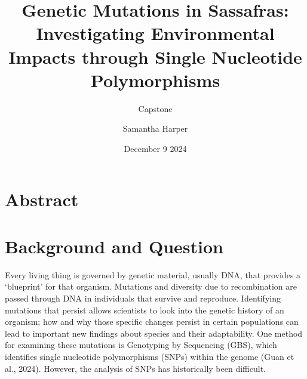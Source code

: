 \documentclass[
]{article}
\title{Genetic Mutations in Sassafras: Investigating Environmental
Impacts through Single Nucleotide Polymorphisms}
\subtitle{Capstone}
\author{Samantha Harper}
\date{December 9 2024}
\begin{document}
\maketitle

{
\setcounter{tocdepth}{2}
\tableofcontents
}
\newpage

\section{Abstract}\label{abstract}

\section{Background and Question}\label{background-and-question}

Every living thing is governed by genetic material, usually DNA, that
provides a `blueprint' for that organism. Mutations and diversity due to
recombination are passed through DNA in individuals that survive and
reproduce. Identifying mutations that persist allows scientists to look
into the genetic history of an organism; how and why those specific
changes persist in certain populations can lead to important new
findings about species and their adaptability. One method for examining
these mutations is Genotyping by Sequencing (GBS), which identifies
single nucleotide polymorphisms (SNPs) within the genome (Guan et al.,
2024). However, the analysis of SNPs has historically been difficult.
\end{document}
